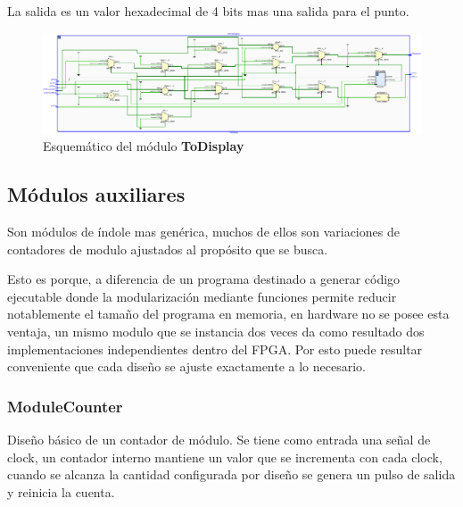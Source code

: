 \documentclass[12pt]{article}
\begin{document}
La salida es un valor hexadecimal de 4 bits mas una salida para el punto.
\begin{figure}[H]
    \centering
    \includegraphics[width=\textwidth]{to-display-crop}
    \caption{Esquemático del módulo \textbf{ToDisplay}}
\end{figure}

\subsection{Módulos auxiliares}
Son módulos de índole mas genérica, muchos de ellos son variaciones de contadores de modulo ajustados al propósito que se busca.

Esto es porque, a diferencia de un programa destinado a generar código ejecutable donde la modularización mediante funciones permite reducir notablemente el tamaño del programa en memoria, en hardware no se posee esta ventaja, un mismo modulo que se instancia dos veces da como resultado dos implementaciones independientes dentro del FPGA. Por esto puede resultar conveniente que cada diseño se ajuste exactamente a lo necesario.


\subsubsection{ModuleCounter}
Diseño básico de un contador de módulo. Se tiene como entrada una señal de clock, un contador interno mantiene un valor que se incrementa con cada clock, cuando se alcanza la cantidad configurada por diseño se genera un pulso de salida y reinicia la cuenta.
\end{document}
